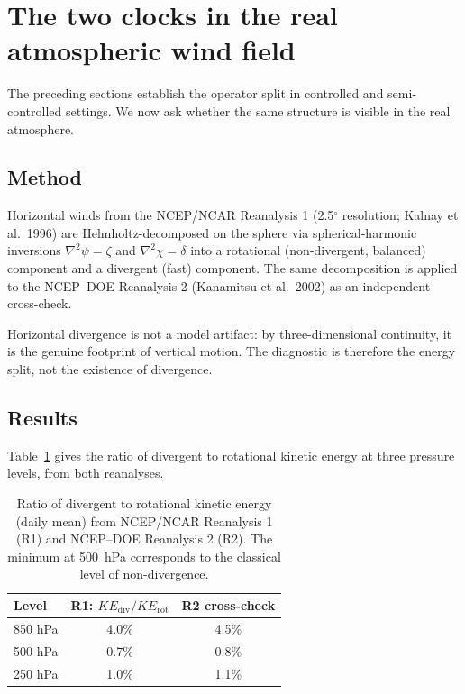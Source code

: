 \documentclass[11pt]{article}
\begin{document}
\section{The two clocks in the real atmospheric wind field}
\label{sec:reanalysis}

The preceding sections establish the operator split in controlled and semi-controlled settings. We now ask whether the same structure is visible in the real atmosphere.

\subsection{Method}

Horizontal winds from the NCEP/NCAR Reanalysis 1 (2.5$^\circ$ resolution; Kalnay et al.\ 1996) are Helmholtz-decomposed on the sphere via spherical-harmonic inversions $\nabla^2\psi = \zeta$ and $\nabla^2\chi = \delta$ into a rotational (non-divergent, balanced) component and a divergent (fast) component. The same decomposition is applied to the NCEP--DOE Reanalysis 2 (Kanamitsu et al.\ 2002) as an independent cross-check.

Horizontal divergence is not a model artifact: by three-dimensional continuity, it is the genuine footprint of vertical motion. The diagnostic is therefore the energy split, not the existence of divergence.

\subsection{Results}

Table~\ref{tab:reanalysis} gives the ratio of divergent to rotational kinetic energy at three pressure levels, from both reanalyses.

\begin{table}[t]
\centering
\caption{Ratio of divergent to rotational kinetic energy (daily mean) from
NCEP/NCAR Reanalysis 1 (R1) and NCEP--DOE Reanalysis 2 (R2). The minimum at
500~hPa corresponds to the classical level of non-divergence.}
\label{tab:reanalysis}
\begin{tabular}{lcc}
\toprule
Level & R1: $KE_{\mathrm{div}}/KE_{\mathrm{rot}}$ &
R2 cross-check \\
\midrule
850 hPa & 4.0\% & 4.5\% \\
500 hPa & 0.7\% & 0.8\% \\
250 hPa & 1.0\% & 1.1\% \\
\bottomrule
\end{tabular}
\end{table}
\end{document}
